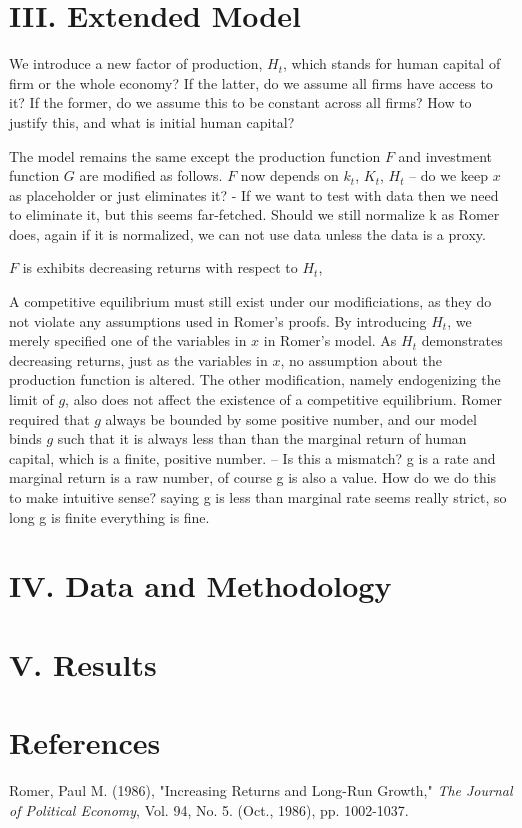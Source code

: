 \documentclass[Journal,letterpaper, NoLineNumbers]{ascelike-new}
\begin{document}
\section{III. Extended Model}

We introduce a new factor of production, $H_t$, which stands for human capital of firm or the whole economy? If the latter, do we assume all firms have access to it? If the former, do we assume this to be constant across all firms? How to justify this, and what is initial human capital?

The model remains the same except the production function $F$ and investment function $G$ are modified as follows. $F$ now depends on $k_t$, $K_t$, $H_t$ -- do we keep $x$ as placeholder or just eliminates it? - If we want to test with data then we need to eliminate it, but this seems far-fetched. Should we still normalize k as Romer does, again if it is normalized, we can not use data unless the data is a proxy. 

$F$ is exhibits decreasing returns with respect to $H_t$, 

A competitive equilibrium must still exist under our modificiations, as they do not violate any assumptions used in Romer's proofs. By introducing $H_t$, we merely specified one of the variables in $x$ in Romer's model. As $H_t$ demonstrates decreasing returns, just as the variables in $x$, no assumption about the production function is altered. The other modification, namely endogenizing the limit of $g$, also does not affect the existence of a competitive equilibrium. Romer required that $g$ always be bounded by some positive number, and our model binds $g$ such that it is always less than than the marginal return of human capital, which is a finite, positive number. -- Is this a mismatch? g is a rate and marginal return is a raw number, of course g is also a value. How do we do this to make intuitive sense? saying g is less than marginal rate seems really strict, so long g is finite everything is fine. 

\section{IV. Data and Methodology}

\section{V. Results}


\section{References}
Romer, Paul M. (1986), "Increasing Returns and Long-Run Growth," \textit{The Journal of Political Economy}, Vol. 94, No. 5. (Oct., 1986), pp. 1002-1037.
\end{document}
